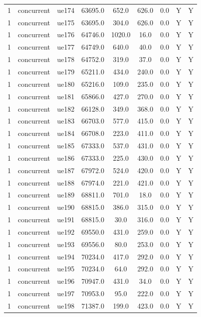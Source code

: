 \begin{table}[ht]
\begin{tabular}{|c|c|c|c|c|c|c|c|c|}
1 & concurrent & ue174 & 63695.0 & 652.0 & 626.0 & 0.0 & Y & Y \\
1 & concurrent & ue175 & 63695.0 & 304.0 & 626.0 & 0.0 & Y & Y \\
1 & concurrent & ue176 & 64746.0 & 1020.0 & 16.0 & 0.0 & Y & Y \\
1 & concurrent & ue177 & 64749.0 & 640.0 & 40.0 & 0.0 & Y & Y \\
1 & concurrent & ue178 & 64752.0 & 319.0 & 37.0 & 0.0 & Y & Y \\
1 & concurrent & ue179 & 65211.0 & 434.0 & 240.0 & 0.0 & Y & Y \\
1 & concurrent & ue180 & 65216.0 & 109.0 & 235.0 & 0.0 & Y & Y \\
1 & concurrent & ue181 & 65866.0 & 427.0 & 270.0 & 0.0 & Y & Y \\
1 & concurrent & ue182 & 66128.0 & 349.0 & 368.0 & 0.0 & Y & Y \\
1 & concurrent & ue183 & 66703.0 & 577.0 & 415.0 & 0.0 & Y & Y \\
1 & concurrent & ue184 & 66708.0 & 223.0 & 411.0 & 0.0 & Y & Y \\
1 & concurrent & ue185 & 67333.0 & 537.0 & 431.0 & 0.0 & Y & Y \\
1 & concurrent & ue186 & 67333.0 & 225.0 & 430.0 & 0.0 & Y & Y \\
1 & concurrent & ue187 & 67972.0 & 524.0 & 420.0 & 0.0 & Y & Y \\
1 & concurrent & ue188 & 67974.0 & 221.0 & 421.0 & 0.0 & Y & Y \\
1 & concurrent & ue189 & 68811.0 & 701.0 & 18.0 & 0.0 & Y & Y \\
1 & concurrent & ue190 & 68815.0 & 386.0 & 315.0 & 0.0 & Y & Y \\
1 & concurrent & ue191 & 68815.0 & 30.0 & 316.0 & 0.0 & Y & Y \\
1 & concurrent & ue192 & 69550.0 & 431.0 & 259.0 & 0.0 & Y & Y \\
1 & concurrent & ue193 & 69556.0 & 80.0 & 253.0 & 0.0 & Y & Y \\
1 & concurrent & ue194 & 70234.0 & 417.0 & 292.0 & 0.0 & Y & Y \\
1 & concurrent & ue195 & 70234.0 & 64.0 & 292.0 & 0.0 & Y & Y \\
1 & concurrent & ue196 & 70947.0 & 431.0 & 34.0 & 0.0 & Y & Y \\
1 & concurrent & ue197 & 70953.0 & 95.0 & 222.0 & 0.0 & Y & Y \\
1 & concurrent & ue198 & 71387.0 & 199.0 & 423.0 & 0.0 & Y & Y \\

\end{tabular}
\end{table}
